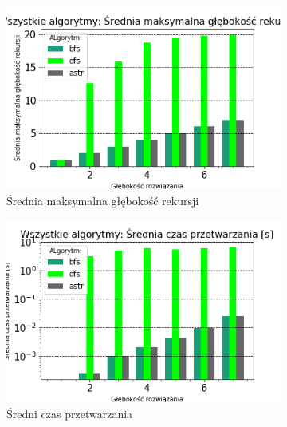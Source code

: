 \documentclass{classrep}
\begin{document}
\begin{figure}[H]
\begin{subfigure}[t]{0.45\textwidth}
        \label{ALL:processed}
    \end{subfigure}
    \qquad
    ~ %
    \begin{subfigure}[t]{0.45\textwidth}
        \includegraphics[width=\textwidth]{charts/ALL_recursed.png}
        \caption{Średnia maksymalna głębokość rekursji}
        \label{ALL:rescursed}
    \end{subfigure}
    \begin{subfigure}[t]{0.45\textwidth}
        \includegraphics[width=\textwidth]{charts/ALL_time.png}
        \caption{Średni czas przetwarzania}
        \label{ALL:time}
    \end{subfigure}
    \begin{subfigure}[t]{0.45\textwidth}

\end{subfigure}
\end{figure}
\end{document}
